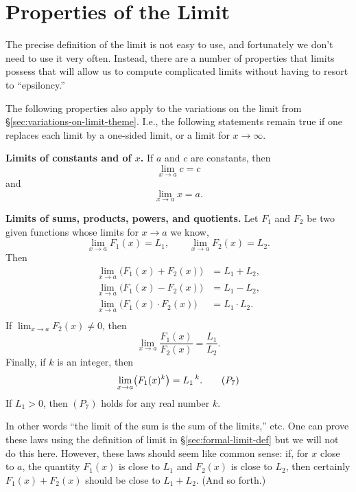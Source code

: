 \section{Properties of the Limit} 
\label{sec:limitProperties}%
The precise definition of the limit is not easy to use, and
fortunately we don't need to use it very often.  Instead, there
are a number of properties that limits possess that will allow us to compute
complicated limits without having to resort to ``epsiloncy.''

The following properties also apply to the variations on the limit from
\S\ref{sec:variations-on-limit-theme}.  I.e., the following statements remain
true if one replaces each limit by a one-sided limit, or a limit for
$x\to\infty$.  \smallskip

\textbf{Limits of constants and of $x$. } If $a$ and $c$ are constants,
then
\begin{equation}
  \lim_{x\to a}c=c \tag{$P_1$}
\end{equation}
and
\begin{equation}
  \lim_{x\to a} x= a.\tag{$P_2$}
\end{equation}

\textbf{Limits of sums, products, powers, and quotients. } Let $F_1$ and $F_2$ be
two given functions whose limits for $x\to a$ we know,
\[
\lim_{x\to a}F_1(x)=L_1, \qquad \lim_{x\to a}F_2(x)=L_2.
\]
Then
\begin{align*}
  \lim_{x\to a}\bigl(F_1(x)+F_2(x)\bigr) &= L_1+L_2, \tag{$P_3$} \\
  \lim_{x\to a}\bigl(F_1(x)-F_2(x)\bigr) &= L_1 - L_2, \tag{$P_4$} \\
  \lim_{x\to a}\bigl(F_1(x)\cdot F_2(x)\bigr) &= L_1\cdot L_2 . \tag{$P_5$} \\
\end{align*}
If $ \lim_{x\to a}F_2(x)\ne0$, then
\begin{equation}
  \lim_{x\to a}\frac{F_1(x)}{F_2(x)}= \frac{L_1}{L_2}.\tag{$P_6$}
\end{equation}
Finally, if $k$ is an integer, then
\begin{equation}
\lim_{x\to a}\bigl(F_1(x)^k\bigr) = L_1\,^k . \tag{$P_{7}$}
\end{equation}
If $L_1 > 0$, then $(P_7)$ holds for any real number $k$.

In other words ``the limit of the sum is the sum of the limits,'' etc.  One can
prove these laws using the definition of limit in
\S\ref{sec:formal-limit-def} but we will not do this here.  However, these laws
should seem like common sense: if, for $x$ close to $a$, the quantity
$F_1(x)$ is close to $L_1$ and $F_2(x)$ is close to $L_2$, then certainly
$F_1(x)+F_2(x)$ should be close to $L_1+L_2$. (And so forth.)



